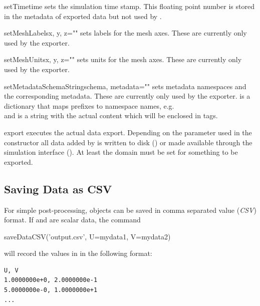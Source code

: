 \begin{methoddesc}[DataManager]{setTime}{time}
    sets the simulation time stamp. This floating point number is stored in
    the metadata of exported data but not used by .
\end{methoddesc}

\begin{methoddesc}[DataManager]{setMeshLabels}{x, y, z=""}
    sets labels for the mesh axes. These are currently only used by the \SILO
    exporter.
\end{methoddesc}

\begin{methoddesc}[DataManager]{setMeshUnits}{x, y, z=""}
    sets units for the mesh axes. These are currently only used by the \SILO
    exporter.
\end{methoddesc}

\begin{methoddesc}[DataManager]{setMetadataSchemaString}{schema, metadata=""}
    sets metadata namespaces and the corresponding metadata. These are
    currently only used by the \VTK exporter.
     is a dictionary that maps prefixes to namespace names, e.g.\\
     and  is a
    string with the actual content which will be enclosed in 
    tags.
\end{methoddesc}

\begin{methoddesc}[DataManager]{export}{}
    executes the actual data export. Depending on the  parameter
    used in the constructor all data added by  is written to
    disk () or made available through the \VisIt
    simulation interface ().
    At least the domain must be set for something to be exported.
\end{methoddesc}

\subsection{Saving Data as CSV}
\label{sec:savedatacsv}
For simple post-processing, \Data objects can be saved in comma separated
value (\emph{CSV}) format.
If  and  are scalar data, the command
\begin{python}
  saveDataCSV('output.csv', U=mydata1, V=mydata2)
\end{python}
will record the values in  in the following format:
\begin{verbatim}
U, V
1.0000000e+0, 2.0000000e-1
5.0000000e-0, 1.0000000e+1
...
\end{verbatim}

